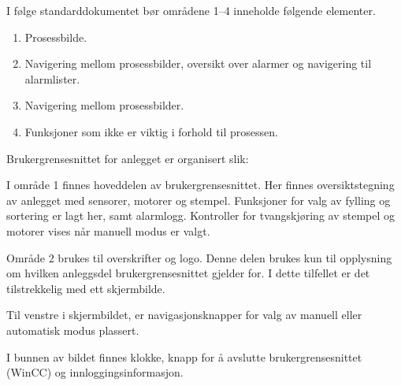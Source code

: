 \documentclass[Visionprosjekt.tex]{subfiles}
\begin{document}



I følge standarddokumentet bør områdene 1--4 inneholde følgende elementer.
\begin{enumerate}
	\item Prosessbilde.
    \item Navigering mellom prosessbilder, oversikt over alarmer og navigering til alarmlister.
    \item Navigering mellom prosessbilder.
    \item Funksjoner som ikke er viktig  i forhold til prosessen.
\end{enumerate}



\clearpage
Brukergrensesnittet for anlegget er organisert slik:
\begin{description}[style=multiline,leftmargin=22mm]

    \item[Område 1] I område 1 finnes hoveddelen av brukergrensesnittet. Her finnes oversiktstegning av anlegget med sensorer, motorer og stempel. Funksjoner for valg av fylling og sortering er lagt her, samt alarmlogg. Kontroller for tvangskjøring av stempel og motorer vises  når manuell modus er valgt.

    \item[Område 2] Område 2 brukes til overskrifter og logo. Denne delen brukes kun til opplysning om hvilken anleggsdel brukergrensesnittet gjelder for. I dette tilfellet er det tilstrekkelig med ett skjermbilde.

    \item[Område 3] Til venstre i skjermbildet, er navigasjonsknapper for valg av manuell eller automatisk modus plassert.

    \item[Område 4]  I bunnen av bildet finnes klokke, knapp for å avslutte brukergrensesnittet (WinCC) og innloggingsinformasjon.

\end{description}
\end{document}
